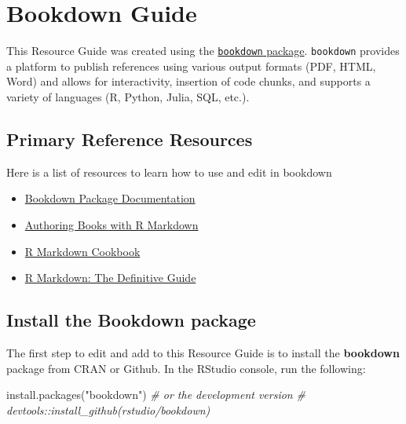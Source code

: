 \documentclass[
]{book}
\newenvironment{Shaded}{\begin{snugshade}}{\end{snugshade}}
\newcommand{\CommentTok}[1]{\textcolor[rgb]{0.56,0.35,0.01}{\textit{#1}}}
\newcommand{\FunctionTok}[1]{\textcolor[rgb]{0.00,0.00,0.00}{#1}}
\newcommand{\NormalTok}[1]{#1}
\newcommand{\StringTok}[1]{\textcolor[rgb]{0.31,0.60,0.02}{#1}}
\providecommand{\tightlist}{%
  \setlength{\itemsep}{0pt}\setlength{\parskip}{0pt}}
\begin{document}
\hypertarget{bookdown}{%
\chapter{Bookdown Guide}\label{bookdown}}

This Resource Guide was created using the \href{https://github.com/rstudio/bookdown}{\texttt{bookdown} package}. \texttt{bookdown} provides a platform to publish references using various output formats (PDF, HTML, Word) and allows for interactivity, insertion of code chunks, and supports a variety of languages (R, Python, Julia, SQL, etc.).

\hypertarget{primary-reference-resources}{%
\section{Primary Reference Resources}\label{primary-reference-resources}}

Here is a list of resources to learn how to use and edit in bookdown

\begin{itemize}
\tightlist
\item
  \href{https://bookdown.org/}{Bookdown Package Documentation}
\item
  \href{https://bookdown.org/yihui/bookdown/}{Authoring Books with R Markdown}
\item
  \href{https://bookdown.org/yihui/rmarkdown-cookbook/}{R Markdown Cookbook}
\item
  \href{https://bookdown.org/yihui/rmarkdown/}{R Markdown: The Definitive Guide}
\end{itemize}

\hypertarget{install-the-bookdown-package}{%
\section{Install the Bookdown package}\label{install-the-bookdown-package}}

The first step to edit and add to this Resource Guide is to install the \textbf{bookdown} package from CRAN or Github. In the RStudio console, run the following:

\begin{Shaded}
\begin{Highlighting}[]
\FunctionTok{install.packages}\NormalTok{(}\StringTok{"bookdown"}\NormalTok{)}
\CommentTok{\# or the development version}
\CommentTok{\# devtools::install\_github(\textquotesingle{}rstudio/bookdown\textquotesingle{})}
\end{Highlighting}
\end{Shaded}
\end{document}
